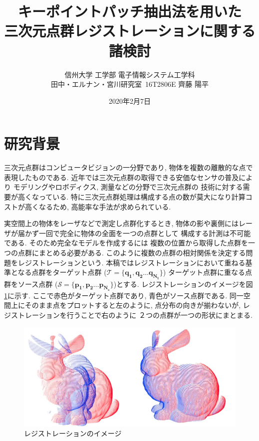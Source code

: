 \documentclass[twocolumn, 9pt, a4j, dvipdfmx]{jsarticle}
\title{
    キーポイントパッチ抽出法を用いた\\
    三次元点群レジストレーションに関する諸検討
}
\author{
    信州大学 工学部 電子情報システム工学科\\
    田中・エルナン・宮川研究室\ 16T2806E 齊藤 陽平
}
\date{2020年2月7日}
\begin{document}
\vspace{5em}
\maketitle
\section{研究背景}
三次元点群はコンピュータビジョンの一分野であり, 
物体を複数の離散的な点で表現したものである.
近年では三次元点群の取得できる安価なセンサの普及により
モデリングやロボディクス, 測量などの分野で三次元点群の
技術に対する需要が高くなっている. 
特に三次元点群処理は構成する点の数が莫大になり計算コストが高くなるため, 
高能率な手法が求められている.

実空間上の物体をレーザなどで測定し点群化するとき,
物体の影や裏側にはレーザが届かず一回で完全に物体の全面を一つの点群として
構成する計測は不可能である.
そのため完全なモデルを作成するには
複数の位置から取得した点群を一つの点群にまとめる必要がある. 
このように複数の点群の相対関係を決定する問題をレジストレーションという. 
本稿ではレジストレーションにおいて重ねる基準となる点群をターゲット点群
($\mathcal{T}=\{\bm{q_1}, \bm{q_2}\ldots\bm{q_{N_t}}\}$)
ターゲット点群に重なる点群をソース点群
($\mathcal{S}=\{\bm{p_1}, \bm{p_2}\ldots\bm{p_{N_s}}\}$)とする. 
レジストレーションのイメージを図\ref{registration}に示す. 
ここで赤色がターゲット点群であり, 青色がソース点群である. 
同一空間上にそのまま点をプロットすると左のように, 
点分布の向きが揃わないが, レジストレーションを行うことで右のように
２つの点群が一つの形状にまとまる. 
\vspace{-2mm}
\begin{figure}[H]
    \centering
    \includegraphics[clip, width=0.75\linewidth]{./img/registration.png}
    \caption{レジストレーションのイメージ\label{registration}}
\end{figure}
\vspace{-5mm}
\end{document}

